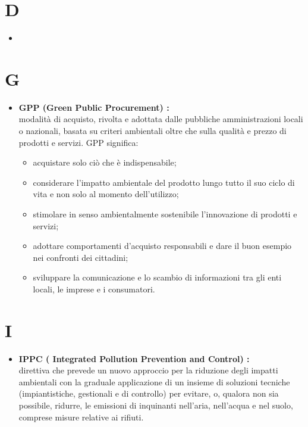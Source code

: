 \documentclass[11pt]{book}              %
\begin{document}
\section*{D}
\begin{itemize}

\item 
\end{itemize}
\section*{G}
\begin{itemize}

	\item \textbf{{\color{OliveGreen}GPP} (Green Public Procurement) :} \\
	modalità di acquisto, rivolta e adottata dalle pubbliche amministrazioni locali o nazionali, basata su criteri ambientali oltre che sulla qualità e prezzo di prodotti e servizi. 
	GPP significa:
	\begin{itemize}
		\item acquistare solo ciò che è indispensabile;
	 	\item considerare l’impatto ambientale del prodotto lungo tutto il suo ciclo di vita e non solo al momento dell’utilizzo;
    		\item stimolare in senso ambientalmente sostenibile l’innovazione di prodotti e servizi;
    		\item adottare comportamenti d’acquisto responsabili e dare il buon esempio nei confronti dei cittadini;
    		\item sviluppare la comunicazione e lo scambio di informazioni tra gli enti locali, le imprese e i consumatori.
	\end{itemize}

\end{itemize}

\section*{I}
\begin{itemize}

	\item \textbf{{\color{OliveGreen}IPPC} ( Integrated Pollution Prevention and Control) :} \\
	 direttiva che prevede un nuovo approccio per la riduzione degli impatti ambientali con la graduale applicazione di un insieme di soluzioni tecniche (impiantistiche, gestionali e di controllo) per evitare, o, qualora non sia possibile, ridurre, le emissioni di inquinanti nell'aria, nell'acqua e nel suolo, comprese misure relative ai rifiuti.

\end{itemize}
\end{document}

